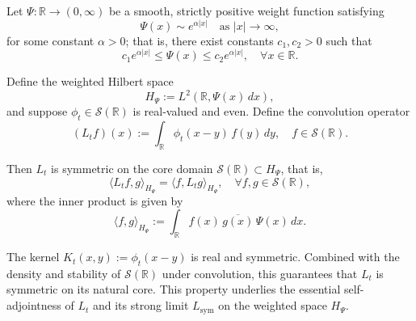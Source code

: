 \begin{proposition}
\label{prop:symmetry_Lt_Schwartz}
Let \( \Psi \colon \mathbb{R} \to (0,\infty) \) be a smooth, strictly positive weight function satisfying
\[
\Psi(x) \sim e^{\alpha|x|} \quad \text{as } |x| \to \infty,
\]
for some constant \( \alpha > 0 \); that is, there exist constants \( c_1, c_2 > 0 \) such that
\[
c_1 e^{\alpha |x|} \le \Psi(x) \le c_2 e^{\alpha |x|}, \quad \forall x \in \mathbb{R}.
\]

Define the weighted Hilbert space
\[
H_\Psi := L^2(\mathbb{R}, \Psi(x)\, dx),
\]
and suppose \( \phi_t \in \mathcal{S}(\mathbb{R}) \) is real-valued and even. Define the convolution operator
\[
(L_t f)(x) := \int_{\mathbb{R}} \phi_t(x - y)\, f(y)\, dy, \quad f \in \mathcal{S}(\mathbb{R}).
\]

Then \( L_t \) is symmetric on the core domain \( \mathcal{S}(\mathbb{R}) \subset H_\Psi \), that is,
\[
\langle L_t f, g \rangle_{H_\Psi} = \langle f, L_t g \rangle_{H_\Psi}, \quad \forall f, g \in \mathcal{S}(\mathbb{R}),
\]
where the inner product is given by
\[
\langle f, g \rangle_{H_\Psi} := \int_{\mathbb{R}} f(x)\, \overline{g(x)}\, \Psi(x)\, dx.
\]

\medskip
\noindent The kernel \( K_t(x,y) := \phi_t(x - y) \) is real and symmetric. Combined with the density and stability of \( \mathcal{S}(\mathbb{R}) \) under convolution, this guarantees that \( L_t \) is symmetric on its natural core. This property underlies the essential self-adjointness of \( L_t \) and its strong limit \( L_{\mathrm{sym}} \) on the weighted space \( H_\Psi \).
\end{proposition}
